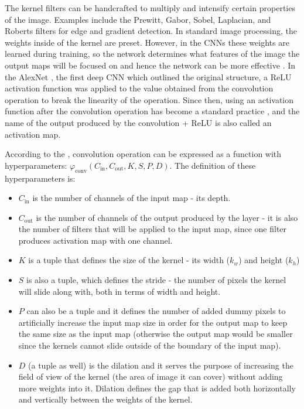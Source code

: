 The kernel filters can be handcrafted to multiply and intensify certain properties of the image. Examples include the Prewitt, Gabor, Sobel, Laplacian, and Roberts filters for edge and gradient detection. In standard image processing, the weights inside of the kernel are preset. However, in the CNNs these weights are learned during training, so the network determines what features of the image the output maps will be focused on and hence the network can be more effective \cite{Santosh2022-2, He2023}. In the AlexNet \cite{Krizhevsky2012}, the first deep CNN which outlined the original structure, a ReLU activation function was applied to the value obtained from the convolution operation to break the linearity of the operation. Since then, using an activation function after the convolution operation has become a standard practice \cite{Santosh2022-2, He2023}, and the name of the output produced by the convolution + ReLU is also called an activation map.

According to the \cite{Santosh2022-2}, convolution operation can be expressed as a function with hyperparameters: $\varphi_{\text{conv}}(C_{\text{in}}, C_{\text{out}}, K, S, P, D)$. The definition of these hyperparameters is:

\begin{itemize}
    \item $C_{\text{in}}$ is the number of channels of the input map - its depth.
    \item $C_{\text{out}}$ is the number of channels of the output produced by the layer - it is also the number of filters that will be applied to the input map, since one filter produces activation map with one channel.
    \item $K$ is a tuple that defines the size of the kernel - its width ($k_w$) and height ($k_h$)
    \item $S$ is also a tuple, which defines the stride - the number of pixels the kernel will slide along with, both in terms of width and height.
    \item $P$ can also be a tuple and it defines the number of added dummy pixels to artificially increase the input map size in order for the output map to keep the same size as the input map (otherwise the output map would be smaller since the kernels cannot slide outside of the boundary of the input map).
    \item $D$ (a tuple as well) is the dilation and it serves the purpose of increasing the field of view of the kernel (the area of image it can cover) without adding more weights into it. Dilation defines the gap that is added both horizontally and vertically between the weights of the kernel.
\end{itemize}


